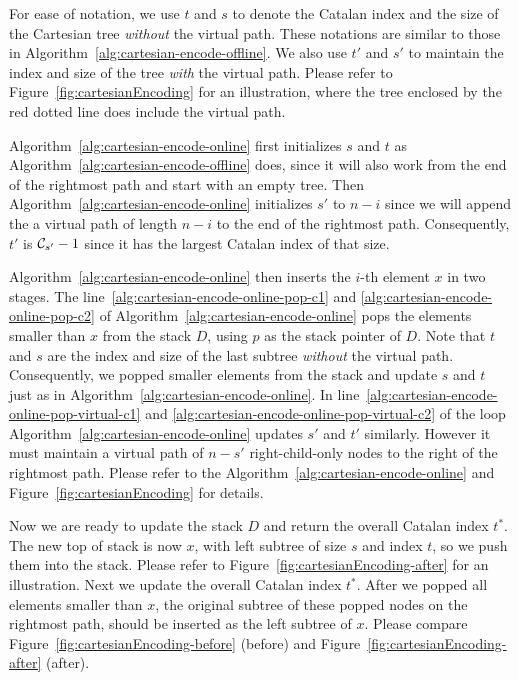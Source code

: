 For ease of notation, we use $t$ and $s$ to denote the Catalan index and
the size of the Cartesian tree {\em without} the virtual path. These
notations are similar to those in
Algorithm~\ref{alg:cartesian-encode-offline}.  We also use $t'$ and $s'$
to maintain the index and size of the tree {\em with} the virtual path.
Please refer to Figure~\ref{fig:cartesianEncoding} for an illustration,
where the tree enclosed by the red dotted line does include the virtual
path.

Algorithm~\ref{alg:cartesian-encode-online} first initializes $s$ and
$t$ as Algorithm~\ref{alg:cartesian-encode-offline} does, since it will
also work from the end of the rightmost path and start with an empty
tree.  Then Algorithm~\ref{alg:cartesian-encode-online} initializes $s'$
to $n - i$ since we will append the a virtual path of length $n - i$ to
the end of the rightmost path.  Consequently, $t'$ is ${\cal C}_{s'} -
1$ since it has the largest Catalan index of that size.

Algorithm~\ref{alg:cartesian-encode-online} then inserts the $i$-th
element $x$ in two stages.  The
line~\ref{alg:cartesian-encode-online-pop-c1} and
\ref{alg:cartesian-encode-online-pop-c2} of
Algorithm~\ref{alg:cartesian-encode-online} pops the elements smaller
than $x$ from the stack $D$, using $p$ as the stack pointer of $D$. Note
that $t$ and $s$ are the index and size of the last subtree {\em
without} the virtual path.  Consequently, we popped smaller elements
from the stack and update $s$ and $t$ just as in
Algorithm~\ref{alg:cartesian-encode-online}.  In
line~\ref{alg:cartesian-encode-online-pop-virtual-c1} and
\ref{alg:cartesian-encode-online-pop-virtual-c2} of the loop
Algorithm~\ref{alg:cartesian-encode-online} updates $s'$ and $t'$
similarly.  However it must maintain a virtual path of $n-s'$
right-child-only nodes to the right of the rightmost path.  Please refer
to the Algorithm~\ref{alg:cartesian-encode-online} and
Figure~\ref{fig:cartesianEncoding} for details.



Now we are ready to update the stack $D$ and return the overall Catalan
index $t^*$.  The new top of stack is now $x$, with left subtree of size
$s$ and index $t$, so we push them into the stack. Please refer to
Figure~\ref{fig:cartesianEncoding-after} for an illustration.  Next we
update the overall Catalan index $t^*$.  After we popped all elements
smaller than $x$, the original subtree of these popped nodes on the
rightmost path, should be inserted as the left subtree of $x$.  Please
compare Figure~\ref{fig:cartesianEncoding-before} (before) and
Figure~\ref{fig:cartesianEncoding-after} (after).

